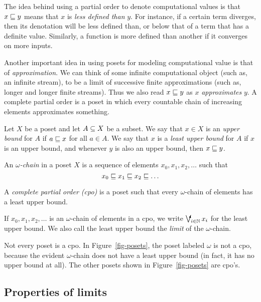 \documentclass{article}
\begin{document}
The idea behind using a partial order to denote computational values
is that $x\sqsubseteq y$ means that $x$ is {\em less defined than} $y$. For
instance, if a certain term diverges, then its denotation will be less
defined than, or below that of a term that has a definite value.
Similarly, a function is more defined than another if it converges on
more inputs.

Another important idea in using posets for modeling computational
value is that of {\em approximation}. We can think of some infinite
computational object (such as, an infinite stream), to be a limit of
successive finite approximations (such as, longer and longer finite
streams). Thus we also read $x\sqsubseteq y$ as $x$ {\em approximates} $y$.
A complete partial order is a poset in which every countable chain of
increasing elements approximates something.

\begin{definition}
  Let $X$ be a poset and let $A\subseteq X$ be a subset. We say that $x\in
  X$ is an {\em upper bound} for $A$ if $a\sqsubseteq x$ for all $a\in A$.
  We say that $x$ is a {\em least upper bound} for $A$ if $x$ is an
  upper bound, and whenever $y$ is also an upper bound, then $x\sqsubseteq
  y$.
\end{definition}

\begin{definition}
  An {\em $\omega$-chain} in a poset $X$ is a sequence of elements
  $x_0,x_1,x_2,\ldots$ such that
  \[ x_0 \sqsubseteq x_1 \sqsubseteq x_2 \sqsubseteq \ldots \]
\end{definition}

\begin{definition}
  A {\em complete partial order (cpo)} is a poset such that every
  $\omega$-chain of elements has a least upper bound.
\end{definition}

If $x_0,x_1,x_2,\ldots$ is an $\omega$-chain of elements in a cpo, we
write $\dirsup_{i\in\N}x_i$ for the least upper bound. We also call
the least upper bound the {\em limit} of the $\omega$-chain.

Not every poset is a cpo. In Figure~\ref{fig-posets}, the poset
labeled $\omega$ is not a cpo, because the evident $\omega$-chain does
not have a least upper bound (in fact, it has no upper bound at all).
The other posets shown in Figure~\ref{fig-posets} are cpo's. 

\subsection{Properties of limits}
\end{document}
